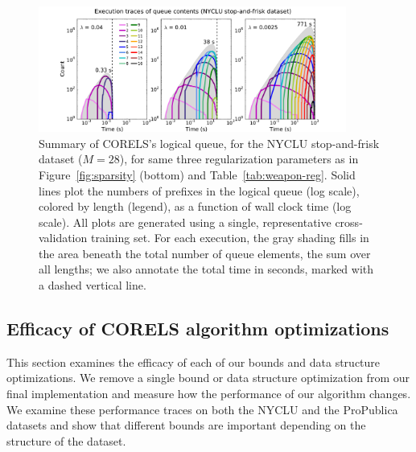 \begin{figure}[t!]
\begin{center}
\includegraphics[trim={30mm 0mm 30mm 5mm},
width=0.9\textwidth]{figs/weapon_reg-queue.pdf}
\end{center}
\vspace{-5mm}
\caption{Summary of CORELS's logical queue,
for the NYCLU stop-and-frisk dataset (${M = 28}$),
for same three regularization parameters as in Figure~\ref{fig:sparsity} (bottom)
and Table~\ref{tab:weapon-reg}.
%
Solid lines plot the numbers of prefixes in the logical queue (log scale), colored by length (legend),
as a function of wall clock time (log scale).
%
All plots are generated using a single, representative cross-validation training set.
%
For each execution, the gray shading fills in the area beneath the total number
of queue elements, \ie the sum over all lengths;
we also annotate the total time in seconds, marked with a dashed vertical line.
}
\label{fig:queue-weapon-reg}
\end{figure}

\subsection{Efficacy of CORELS algorithm optimizations}
\label{sec:ablation}

This section examines the efficacy of each of our bounds and data structure optimizations.
%
We remove a single bound or data structure optimization from our final implementation and measure
how the performance of our algorithm changes.
%
We examine these performance traces on both the NYCLU and the ProPublica datasets and show that
different bounds are important depending on the structure of the dataset.

